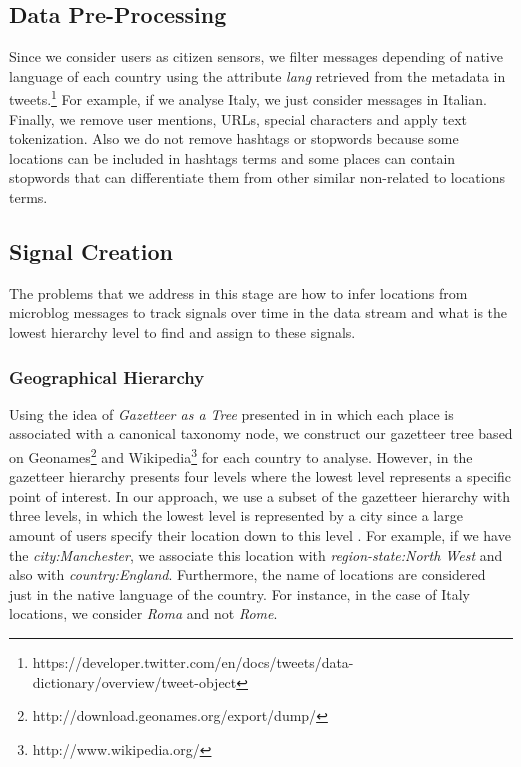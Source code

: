 \documentclass[sigconf]{acmart}
\begin{document}
\subsection{Data Pre-Processing}

Since we consider users as citizen sensors, we filter messages depending of native language of each country using the attribute \textit{lang} retrieved from the metadata in tweets.\footnote{https://developer.twitter.com/en/docs/tweets/data-dictionary/overview/tweet-object} For example, if we analyse Italy, we just consider messages in Italian. Finally, we remove user mentions, URLs,  special characters and apply text tokenization. Also we do not remove hashtags or stopwords because some locations can be included in hashtags terms and some places can contain stopwords that can differentiate them from other similar non-related to locations terms.

\subsection{Signal Creation}
The problems that we address in this stage are how to infer locations from microblog messages to track signals over time in the data stream and what is the lowest hierarchy level to find and assign to these signals.

\subsubsection{Geographical Hierarchy}\label{sssec:geohie}
Using the idea of \textit{Gazetteer as a Tree} presented in \cite{yin2014pinpointing} in which each place is associated with a canonical taxonomy node, we construct our gazetteer tree based on Geonames\footnote{http://download.geonames.org/export/dump/} and Wikipedia\footnote{http://www.wikipedia.org/} for each country to analyse. However, in \cite{yin2014pinpointing} the gazetteer hierarchy presents four levels where the lowest level represents a specific point of interest. In our approach, we use a subset of the gazetteer hierarchy with three levels, in which the lowest level is represented by a city since a large amount of users specify their location down to this level \cite{hecht2011tweets}. For example, if we have the \textit{city:Manchester}, we associate this location with \textit{region-state:North West} and also with \textit{country:England}. Furthermore, the name of locations are considered just in the native language of the country. For instance, in the case of Italy locations, we consider \textit{Roma} and not \textit{Rome}.
\end{document}
